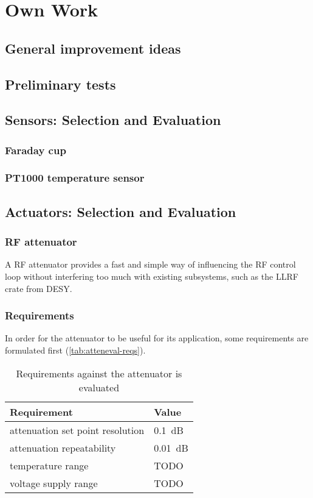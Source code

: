 \chapter{Own Work}
\section{General improvement ideas}
\section{Preliminary tests}
\section{Sensors: Selection and Evaluation}
\subsection{Faraday cup}
\subsection{PT1000 temperature sensor}
\section{Actuators: Selection and Evaluation}
\subsection{RF attenuator}
A RF attenuator provides a fast and simple way of influencing the RF control loop without interfering too much with existing subsystems, such as the LLRF crate from DESY.

\FloatBarrier
\subsection{Requirements}
In order for the attenuator to be useful for its application, some requirements are formulated first (\autoref{tab:atteneval-reqs}).

\begin{table}[tbh!]
	\centering
	\caption{Requirements against the attenuator is evaluated}
	\label{tab:atteneval-reqs}
	\begin{tabular}{ll}
		\toprule
		\textbf{Requirement} & \textbf{Value}\\
		\midrule
		attenuation set point resolution & \SI{0.1}{\dB}\\
		attenuation repeatability  & \SI{0.01}{\dB}\\
		\midrule
		temperature range & TODO \\
		voltage supply range & TODO\\
		\bottomrule
	\end{tabular}
\end{table}

